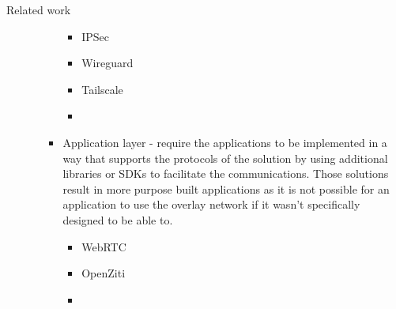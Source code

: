 \begin{frame}{Related work}
\begin{itemize}
\begin{itemize}
\begin{itemize}
      \begin{itemize}
      \tightlist
      \item
        IPSec
      \item
        Wireguard
      \item
        Tailscale
      \item
      \end{itemize}
    \item
      Application layer - require the applications to be implemented in a way that supports the protocols of the solution by using additional libraries or SDKs to facilitate the communications. Those solutions result in more purpose built applications as it is not possible for an application to use the overlay network if it wasn't specifically designed to be able to.

      \begin{itemize}
      \tightlist
      \item
        WebRTC
      \item
        OpenZiti
      \item
      \end{itemize}
    \end{itemize}
  \end{itemize}
\end{itemize}
\end{frame}

